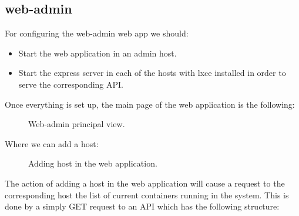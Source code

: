 \subsection{web-admin}
For configuring the web-admin web app we should:
\begin{itemize}
	\item{Start the web application in an admin host.}
	\item{Start the express server in each of the hosts with lxce installed in order to serve the corresponding API.}
\end{itemize}

Once everything is set up, the main page of the web application is the following:
\begin{figure}[H]
\label{fig:web-admin}
\centering
{}
\caption[web-admin host view]{\footnotesize{Web-admin principal view.}}
\end{figure}

Where we can add a host:
\begin{figure}[H]
\label{fig:lxce list}
\centering
{}
\caption[web-admin add host]{\footnotesize{Adding host in the web application.}}
\end{figure}

The action of adding a host in the web application will cause a request to the corresponding host the list of current containers running in the system. This is done by a simply GET request to an API which has the following structure:

